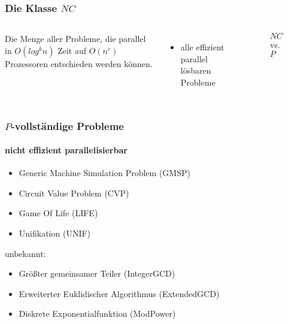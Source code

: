 \begin{frame}
    \frametitle{Die Klasse $NC$}
    \begin{columns}
        \begin{definition}[$NC$]
            Die Menge aller Probleme, die parallel
            in $O(log^k n)$ Zeit auf $O(n^c)$ Prozessoren entschieden werden können.
        \end{definition}
        \begin{itemize}
            \item alle effizient parallel lösbaren Probleme
        \end{itemize}
        \begin{figure}
            \centering
            
            \caption{$NC$ vs. $P$}
        \end{figure}
    \end{columns}
\end{frame}

\begin{frame}
    \frametitle{$P$-vollständige Probleme}
    \framesubtitle{nicht effizient parallelisierbar}
    \begin{itemize}
        \item Generic Machine Simulation Problem (GMSP)
        \item Circuit Value Problem (CVP)
        \item Game Of Life (LIFE)
        \item Unifikation (UNIF)
    \end{itemize}
    \pause
    unbekannt:
    \begin{itemize}
        \item Größter gemeinsamer Teiler (IntegerGCD)
        \item Erweiterter Euklidischer Algorithmus (ExtendedGCD)
        \item Diskrete Exponentialfunktion (ModPower)
    \end{itemize}
\end{frame}
